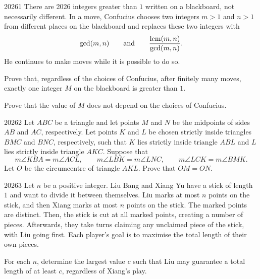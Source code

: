 
\begin{problem}{2026}{1}
There are 2026 integers greater than $1$ written on a blackboard, not necessarily different. In a move, Confucius chooses two integers $m>1$ and $n>1$ from different places on the blackboard and replaces these two integers with
\[
    \gcd(m, n) \qquad\text{and}\qquad
    \frac{\operatorname{lcm}(m, n)}{\gcd(m, n)}.
\]
He continues to make moves while it is possible to do so.
\begin{problemsubparts}
    \item Prove that, regardless of the choices of Confucius, after finitely many moves, exactly one integer $M$ on the blackboard is greater than $1$.
    \item Prove that the value of $M$ does not depend on the choices of Confucius.
\end{problemsubparts}
\end{problem}

\begin{problem}{2026}{2}
Let $ABC$ be a triangle and let points $M$ and $N$ be the midpoints of sides $AB$ and $AC$, respectively. Let points $K$ and $L$ be chosen strictly inside triangles $BMC$ and $BNC$, respectively, such that $K$ lies strictly inside triangle $ABL$ and $L$ lies strictly inside triangle $AKC$. Suppose that
\[
    m\angle KBA=m\angle ACL, \qquad
    m\angle LBK=m\angle LNC, \qquad
    m\angle LCK=m\angle BMK.
\]
Let $O$ be the circumcentre of triangle $AKL$. Prove that $OM=ON$.
\end{problem}

\begin{problem}{2026}{3}
Let $n$ be a positive integer. Liu Bang and Xiang Yu have a stick of length $1$ and want to divide it between themselves. Liu marks at most $n$ points on the stick, and then Xiang marks at most $n$ points on the stick. The marked points are distinct. Then, the stick is cut at all marked points, creating a number of pieces. Afterwards, they take turns claiming any unclaimed piece of the stick, with Liu going first. Each player's goal is to maximise the total length of their own pieces.

For each $n$, determine the largest value $c$ such that Liu may guarantee a total length of at least $c$, regardless of Xiang's play.
\end{problem}

